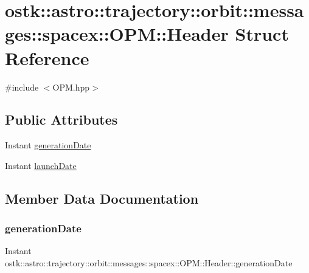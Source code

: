 \hypertarget{structostk_1_1astro_1_1trajectory_1_1orbit_1_1messages_1_1spacex_1_1_o_p_m_1_1_header}{}\section{ostk\+:\+:astro\+:\+:trajectory\+:\+:orbit\+:\+:messages\+:\+:spacex\+:\+:O\+PM\+:\+:Header Struct Reference}
\label{structostk_1_1astro_1_1trajectory_1_1orbit_1_1messages_1_1spacex_1_1_o_p_m_1_1_header}


{\ttfamily \#include $<$O\+P\+M.\+hpp$>$}

\subsection*{Public Attributes}
\begin{DoxyCompactItemize}
\item 
Instant \hyperlink{structostk_1_1astro_1_1trajectory_1_1orbit_1_1messages_1_1spacex_1_1_o_p_m_1_1_header_a1fa4e1566cb7c57213e1112f355fce82}{generation\+Date}
\item 
Instant \hyperlink{structostk_1_1astro_1_1trajectory_1_1orbit_1_1messages_1_1spacex_1_1_o_p_m_1_1_header_a4790963173b1dfc89bfe3ee9b3ce93c6}{launch\+Date}
\end{DoxyCompactItemize}


\subsection{Member Data Documentation}
\mbox{\label{structostk_1_1astro_1_1trajectory_1_1orbit_1_1messages_1_1spacex_1_1_o_p_m_1_1_header_a1fa4e1566cb7c57213e1112f355fce82}} 
\subsubsection{\texorpdfstring{generation\+Date}{generationDate}}
{\footnotesize\ttfamily Instant ostk\+::astro\+::trajectory\+::orbit\+::messages\+::spacex\+::\+O\+P\+M\+::\+Header\+::generation\+Date}

